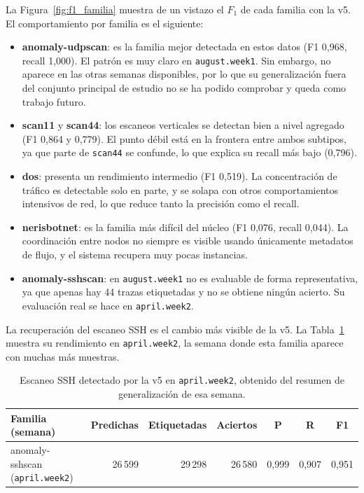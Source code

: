La Figura~\ref{fig:f1_familia} muestra de un vistazo el $F_1$ de cada familia con la v5. El comportamiento por familia es el siguiente:

\begin{itemize}
  \item \textbf{anomaly-udpscan}: es la familia mejor detectada en estos datos (F1 0,968, recall 1,000). El patrón es muy claro en \texttt{august.week1}. Sin embargo, no aparece en las otras semanas disponibles, por lo que su generalización fuera del conjunto principal de estudio no se ha podido comprobar y queda como trabajo futuro.
  \item \textbf{scan11} y \textbf{scan44}: los escaneos verticales se detectan bien a nivel agregado (F1 0,864 y 0,779). El punto débil está en la frontera entre ambos subtipos, ya que parte de \texttt{scan44} se confunde, lo que explica su recall más bajo (0,796).
  \item \textbf{dos}: presenta un rendimiento intermedio (F1 0,519). La concentración de tráfico es detectable solo en parte, y se solapa con otros comportamientos intensivos de red, lo que reduce tanto la precisión como el recall.
  \item \textbf{nerisbotnet}: es la familia más difícil del núcleo (F1 0,076, recall 0,044). La coordinación entre nodos no siempre es visible usando únicamente metadatos de flujo, y el sistema recupera muy pocas instancias.
  \item \textbf{anomaly-sshscan}: en \texttt{august.week1} no es evaluable de forma representativa, ya que apenas hay 44 trazas etiquetadas y no se obtiene ningún acierto. Su evaluación real se hace en \texttt{april.week2}.
\end{itemize}

La recuperación del escaneo SSH es el cambio más visible de la v5. La Tabla~\ref{tab:exp_sshscan} muestra su rendimiento en \texttt{april.week2}, la semana donde esta familia aparece con muchas más muestras.

\begin{table}[ht]
\centering
\small
\begin{tabular}{|l|r|r|r|c|c|c|}
\hline
\textbf{Familia (semana)} & \textbf{Predichas} & \textbf{Etiquetadas} & \textbf{Aciertos} & \textbf{P} & \textbf{R} & \textbf{F1} \\
\hline
anomaly-sshscan (\texttt{april.week2}) & 26\,599 & 29\,298 & 26\,580 & 0,999 & 0,907 & 0,951 \\
\hline
\end{tabular}
\caption{Escaneo SSH detectado por la v5 en \texttt{april.week2}, obtenido del resumen de generalización de esa semana.}
\label{tab:exp_sshscan}
\end{table}

